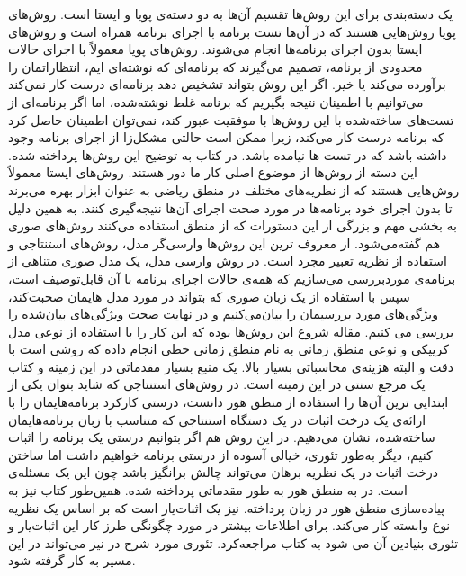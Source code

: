 یک دسته‌بندی برای این روش‌ها تقسیم آن‌ها به دو دسته‌ی پویا و ایستا است. روش‌های پویا روش‌هایی هستند که در آن‌ها تست برنامه با اجرای برنامه همراه است و روش‌های ایستا بدون اجرای برنامه‌ها انجام می‌شوند.
روش‌های پویا معمولاً با اجرای حالات محدودی از برنامه، تصمیم می‌گیرند که برنامه‌ای که نوشته‌ای ایم، انتظاراتمان را برآورده می‌کند یا خیر. اگر این روش بتواند تشخیص دهد برنامه‌ای درست کار نمی‌کند می‌توانیم با اطمینان نتیجه بگیریم که برنامه غلط نوشته‌شده، اما اگر برنامه‌ای از تست‌های ساخته‌شده با این روش‌ها با موفقیت عبور کند، نمی‌توان اطمینان حاصل کرد که برنامه درست کار می‌کند، زیرا ممکن است حالتی مشکل‌زا از اجرای برنامه وجود داشته باشد که در تست ها نیامده باشد. در  کتاب \cite{art}  به توضیح این روش‌ها پرداخته شده. این دسته از روش‌ها از موضوع اصلی کار ما دور هستند.
روش‌های ایستا معمولاً روش‌هایی هستند که از نظریه‌های مختلف در منطق ریاضی به عنوان ابزار بهره می‌برند تا بدون اجرای خود برنامه‌ها در مورد صحت اجرای آن‌ها نتیجه‌گیری کنند. به همین دلیل به بخشی مهم و بزرگی از این دستورات که از منطق استفاده می‌کنند روش‌های صوری هم گفته‌می‌شود. از معروف ترین این روش‌ها وارسی‌گر مدل، روش‌های استنتاجی و استفاده از نظریه تعبیر مجرد است.
در روش وارسی مدل، یک مدل صوری متناهی از برنامه‌ی موردبررسی می‌سازیم که  همه‌ی حالات اجرای برنامه با آن قابل‌توصیف است، سپس با استفاده از یک زبان صوری که بتواند در مورد مدل هایمان صحبت‌کند، ویژگی‌های مورد بررسیمان را بیان‌می‌کنیم و در نهایت صحت ویژگی‌های بیان‌شده را بررسی می کنیم. مقاله \cite{clarke} شروع این روش‌ها بوده که این کار را با استفاده از نوعی مدل کریپکی  \cite{kripke} و نوعی منطق زمانی به نام منطق زمانی خطی \cite{clarke} انجام داده که روشی است با دقت و البته هزینه‌ی محاسباتی بسیار بالا. \cite{logicincs} یک منبع بسیار مقدماتی در این زمینه و کتاب\cite{clarke2} یک مرجع سنتی در این زمینه است.
در روش‌های استنتاجی که شاید بتوان یکی از ابتدایی ترین آن‌ها را استفاده از منطق هور\cite{hoare} دانست، درستی کارکرد برنامه‌هایمان را با ارائه‌ی یک درخت اثبات در یک دستگاه استنتاجی که متناسب با زبان برنامه‌هایمان ساخته‌شده، نشان می‌‌دهیم. در این روش هم اگر بتوانیم درستی یک برنامه را اثبات کنیم، دیگر به‌طور تئوری، خیالی آسوده از درستی برنامه خواهیم داشت اما ساختن درخت اثبات در یک نظریه برهان می‌تواند چالش بر‌انگیز باشد چون این یک مسئله‌ی  است. در\cite{logicincs} به منطق هور به طور مقدماتی پرداخته شده. همین‌طور کتاب\cite{softwarefoundations} نیز به پیاده‌سازی منطق هور در زبان  پرداخته.    نیز یک اثبات‌یار است که بر اساس یک نظریه نوع وابسته کار می‌کند. برای اطلاعات بیشتر در مورد چگونگی طرز کار این اثبات‌یار و تئوری بنیادین آن می شود به کتاب\cite{chlipala} مراجعه‌کرد. تئوری مورد شرح در\cite{dynamic} نیز می‌تواند در این مسیر به کار گرفته شود.
